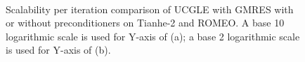 \begin{figure}[htbp]
	\centering
	~\\
	\caption{Scalability per iteration comparison of UCGLE with GMRES with or without preconditioners on Tianhe-2 and ROMEO. A base 10 logarithmic scale is used for Y-axis of (a); a base 2 logarithmic scale is used for Y-axis of (b).}
	\label{fig:myfig}
\end{figure}

